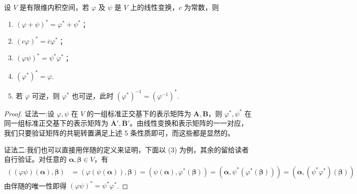 \documentclass[../../main.tex]{subfiles}%
\begin{document}
\begin{theorem}[伴随算子的性质]\label{theorem:伴随算子的性质}
设 $V$ 是有限维内积空间，若 $\varphi$ 及 $\psi$ 是 $V$ 上的线性变换，$c$ 为常数，则
\begin{enumerate}[(1)]
\item $(\varphi + \psi)^* = \varphi^* + \psi^*$；

\item $(c\varphi)^* = \overline{c}\varphi^*$；

\item $(\varphi\psi)^* = \psi^*\varphi^*$；

\item $(\varphi^*)^* = \varphi$.

\item 若 \(\varphi\) 可逆，则 \(\varphi^*\) 也可逆，此时 \((\varphi^*)^{-1}=(\varphi^{-1})^*\). 
\end{enumerate} 
\end{theorem}
\begin{proof}

{\color{blue}证法一:}设 $\varphi, \psi$ 在 $V$ 的一组标准正交基下的表示矩阵为 $\boldsymbol{A}, \boldsymbol{B}$，则 $\varphi^*, \psi^*$ 在同一组标准正交基下的表示矩阵为 $\overline{\boldsymbol{A}}', \overline{\boldsymbol{B}}'$。由线性变换和表示矩阵的一一对应，我们只要验证矩阵的共轭转置满足上述 5 条性质即可，而这些都是显然的。

{\color{blue}证法二:}我们也可以直接用伴随的定义来证明，下面以 (3) 为例，其余的留给读者自行验证。对任意的 $\boldsymbol{\alpha}, \boldsymbol{\beta} \in V$，有
\begin{align*}
((\varphi\psi)(\boldsymbol{\alpha}), \boldsymbol{\beta}) &= (\varphi(\psi(\boldsymbol{\alpha})), \boldsymbol{\beta}) = (\psi(\boldsymbol{\alpha}), \varphi^*(\boldsymbol{\beta})) = (\boldsymbol{\alpha}, \psi^*(\varphi^*(\boldsymbol{\beta}))) = (\boldsymbol{\alpha}, (\psi^*\varphi^*)(\boldsymbol{\beta}))
\end{align*}
由伴随的唯一性即得 $(\varphi\psi)^* = \psi^*\varphi^*$.

\end{proof}
\end{document}
